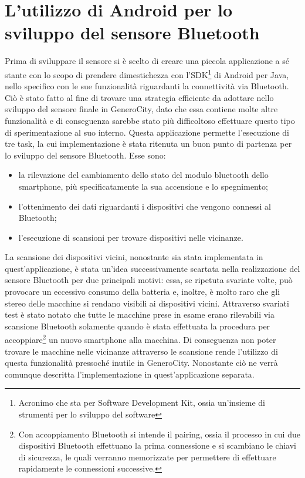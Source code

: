 \chapter{L'utilizzo di Android per lo sviluppo del sensore Bluetooth}
\label{chap:app-separata}
Prima di sviluppare il sensore si è scelto di creare una piccola applicazione a sé stante con lo scopo di prendere dimestichezza con l'SDK\footnote{Acronimo che sta per Software Development Kit, ossia un'insieme di strumenti per lo sviluppo del software} di Android per Java, nello specifico con le sue funzionalità riguardanti la connettività via Bluetooth\cite{ref:bluetooth-doc}. Ciò è stato fatto al fine di trovare una strategia efficiente da adottare nello sviluppo del sensore finale in GeneroCity, dato che essa contiene molte altre funzionalità e di conseguenza sarebbe stato più difficoltoso effettuare questo tipo di sperimentazione al suo interno. Questa applicazione permette l'esecuzione di tre task, la cui implementazione è stata ritenuta un buon punto di partenza per lo sviluppo del sensore Bluetooth. Esse sono:
\begin{itemize}
    \item la rilevazione del cambiamento dello stato del modulo bluetooth dello smartphone, più specificatamente la sua accensione e lo spegnimento;
    \item l'ottenimento dei dati riguardanti i dispositivi che vengono connessi al Bluetooth;
    \item l'esecuzione di scansioni per trovare dispositivi nelle vicinanze.
\end{itemize}
La scansione dei dispositivi vicini, nonostante sia stata implementata in quest'applicazione, è stata un'idea successivamente scartata nella realizzazione del sensore Bluetooth per due principali motivi: essa, se ripetuta svariate volte, può provocare un eccessivo consumo della batteria e, inoltre, è molto raro che gli stereo delle macchine si rendano visibili ai dispositivi vicini. Attraverso svariati test è stato notato che tutte le macchine prese in esame erano rilevabili via scansione Bluetooth solamente quando è stata effettuata la procedura per accoppiare\footnote{Con accoppiamento Bluetooth si intende il pairing, ossia il processo in cui due dispositivi Bluetooth effettuano la prima connessione e si scambiano le chiavi di sicurezza, le quali verranno memorizzate per permettere di effettuare rapidamente le connessioni successive.} un nuovo smartphone alla macchina. Di conseguenza non poter trovare le macchine nelle vicinanze attraverso le scansione rende l'utilizzo di questa funzionalità pressoché inutile in GeneroCity. Nonostante ciò ne verrà comunque descritta l'implementazione in quest'applicazione separata.

